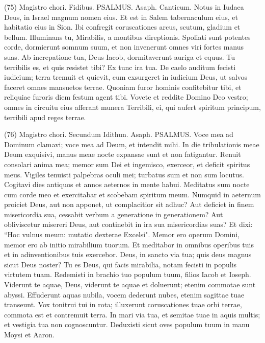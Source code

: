 \begin{biblechapter}  (75) 
\verse  Magistro chori. Fidibus. PSALMUS. Asaph. Canticum. 
\verse Notus in Iudaea Deus, in Israel magnum nomen eius. 
\verse Et est in Salem tabernaculum eius, et habitatio eius in Sion. 
\verse Ibi confregit coruscationes arcus, scutum, gladium et bellum. 
\verse Illuminans tu, Mirabilis, a montibus direptionis. 
\verse Spoliati sunt potentes corde, dormierunt somnum suum, et non invenerunt omnes viri fortes manus suas. 
\verse Ab increpatione tua, Deus Iacob, dormitaverunt auriga et equus. 
\verse Tu terribilis es, et quis resistet tibi? Ex tunc ira tua. 
\verse De caelo auditum fecisti iudicium; terra tremuit et quievit, 
\verse cum exsurgeret in iudicium Deus, ut salvos faceret omnes mansuetos terrae. 
\verse Quoniam furor hominis confitebitur tibi, et reliquiae furoris diem festum agent tibi. 
\verse Vovete et reddite Domino Deo vestro; omnes in circuitu eius afferant munera Terribili, 
\verse ei, qui aufert spiritum principum, terribili apud reges terrae. 
\end{biblechapter}

\begin{biblechapter}  (76) 
\verse  Magistro chori. Secundum Idithun. Asaph. PSALMUS. 
\verse Voce mea ad Dominum clamavi; voce mea ad Deum, et intendit mihi. 
\verse In die tribulationis meae Deum exquisivi, manus meae nocte expansae sunt et non fatigantur. Renuit consolari anima mea; 
\verse memor sum Dei et ingemisco, exerceor, et deficit spiritus meus. 
\verse Vigiles tenuisti palpebras oculi mei; turbatus sum et non sum locutus. 
\verse Cogitavi dies antiquos et annos aeternos in mente habui. 
\verse Meditatus sum nocte cum corde meo et exercitabar et scobebam spiritum meum. 
\verse Numquid in aeternum proiciet Deus, aut non apponet, ut complacitior sit adhuc? 
\verse Aut deficiet in finem misericordia sua, cessabit verbum a generatione in generationem? 
\verse Aut obliviscetur misereri Deus, aut continebit in ira sua misericordias suas? 
\verse Et dixi: “Hoc vulnus meum: mutatio dexterae Excelsi". 
\verse Memor ero operum Domini, memor ero ab initio mirabilium tuorum. 
\verse Et meditabor in omnibus operibus tuis et in adinventionibus tuis exercebor. 
\verse Deus, in sancto via tua; quis deus magnus sicut Deus noster? 
\verse Tu es Deus, qui facis mirabilia, notam fecisti in populis virtutem tuam. 
\verse Redemisti in brachio tuo populum tuum, filios Iacob et Ioseph. 
\verse Viderunt te aquae, Deus, viderunt te aquae et doluerunt; etenim commotae sunt abyssi. 
\verse Effuderunt aquas nubila, vocem dederunt nubes, etenim sagittae tuae transeunt. 
\verse Vox tonitrui tui in rota; illuxerunt coruscationes tuae orbi terrae, commota est et contremuit terra. 
\verse In mari via tua, et semitae tuae in aquis multis; et vestigia tua non cognoscuntur. 
\verse Deduxisti sicut oves populum tuum in manu Moysi et Aaron. 
\end{biblechapter}

